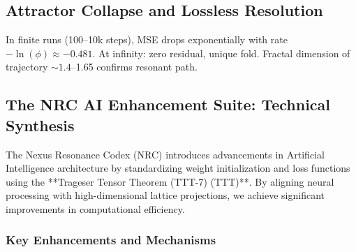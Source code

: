 \documentclass[11pt,a4paper,oneside]{article}
\begin{document}
	\subsection{Attractor Collapse and Lossless Resolution}

	In finite runs (100--10k steps), MSE drops exponentially with rate \(-\ln(\phi) \approx -0.481\). At infinity: zero residual, unique fold. Fractal dimension of trajectory \(\sim 1.4\)--1.65 confirms resonant path.

	\subsection{The NRC AI Enhancement Suite: Technical Synthesis}

	The Nexus Resonance Codex (NRC) introduces advancements in Artificial Intelligence architecture by standardizing weight initialization and loss functions using the **Trageser Tensor Theorem (TTT-7) (TTT)**. By aligning neural processing with high-dimensional lattice projections, we achieve significant improvements in computational efficiency.

	\subsubsection{Key Enhancements and Mechanisms}
\end{document}
